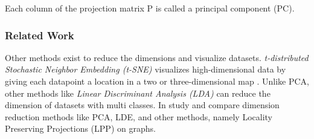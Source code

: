 \noindent Each column of the projection matrix P is called a principal component (PC). 


\subsubsection{Related Work}
\label{subsubsec:dimension-reduction-related-work}
Other methods exist to reduce the dimensions and visualize datasets. \emph{t-distributed Stochastic Neighbor Embedding (t-SNE)} visualizes high-dimensional data by giving each datapoint a location in a two or three-dimensional map \cite{vandermaaten08}. Unlike PCA, other methods like \emph{Linear Discriminant Analysis (LDA)} \cite{martinezPCALDA2001} can reduce the dimension of datasets with multi classes. In \cite{yanGraphEmbeddingExtensions2007} study and compare dimension reduction methods like PCA, LDE, and other methods, namely Locality Preserving Projections (LPP) on graphs.

